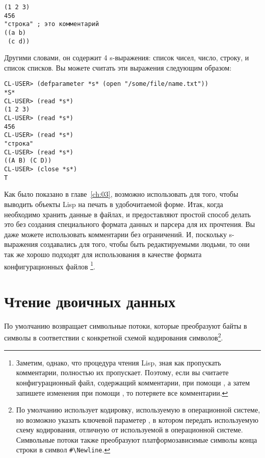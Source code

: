 \begin{lstlisting}
(1 2 3)
456
"строка" ; это комментарий
((a b)
 (c d))
\end{lstlisting}

Другими словами, он содержит 4 s-выражения: список чисел, число, строку, и список
списков. Вы можете считать эти выражения следующим образом:

\begin{lstlisting}
CL-USER> (defparameter *s* (open "/some/file/name.txt"))
*S*
CL-USER> (read *s*)
(1 2 3)
CL-USER> (read *s*)
456
CL-USER> (read *s*)
"строка"
CL-USER> (read *s*)
((A B) (C D))
CL-USER> (close *s*)
T
\end{lstlisting}

Как было показано в главе~\ref{ch:03}, возможно использовать  для того, чтобы выводить
объекты Lisp на печать в удобочитаемой форме. Итак, когда необходимо хранить данные в
файлах,  и  предоставляют простой способ делать это без создания
специального формата данных и парсера для их прочтения. Вы даже можете использовать
комментарии без ограничений. И, поскольку s-выражения создавались для того, чтобы быть
редактируемыми людьми, то они так же хорошо подходят для использования в качестве формата
конфигурационных файлов \footnote{Заметим, однако, что процедура чтения Lisp, зная как
  пропускать комментарии, полностью их пропускает. Поэтому, если вы считаете
  конфигурационный файл, содержащий комментарии, при помощи , а затем запишете
  изменения при помощи , то потеряете все комментарии.}.

\section{Чтение двоичных данных}

По умолчанию  возвращает символьные потоки, которые преобразуют байты в символы
в соответствии с конкретной схемой кодирования символов\footnote{По умолчанию 
  использует кодировку, используемую в операционной системе, но возможно указать ключевой
  параметер , в котором передать используемую схему кодирования,
  отличную от используемой в операционной системе. Символьные потоки также преобразуют
  платформозависимые символы конца строки в символ \lstinline!#\Newline!.}.

